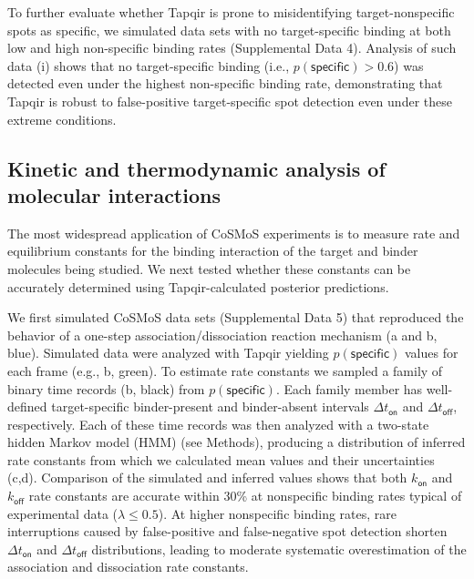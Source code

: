 To further evaluate whether Tapqir is prone to misidentifying target-nonspecific spots as specific, we  simulated data sets with no target-specific binding at both low and high non-specific binding rates (Supplemental Data 4). Analysis of such data (i) shows that no target-specific binding (i.e., $p(\mathsf{specific}) > 0.6$) was detected even under the highest non-specific binding rate, demonstrating that Tapqir is robust to false-positive target-specific spot detection even under these extreme conditions. 



\subsection{Kinetic and thermodynamic analysis of molecular interactions}

The most widespread application of CoSMoS experiments is to measure rate and equilibrium constants for the binding interaction of the target and binder molecules being studied.  We next tested whether these constants can be accurately determined using Tapqir-calculated posterior predictions. 

We first simulated CoSMoS data sets (Supplemental Data 5) that reproduced the behavior of a one-step association/dissociation reaction mechanism (a and b, blue). Simulated data were analyzed with Tapqir yielding $p(\mathsf{specific})$ values for each frame (e.g., b, green). To estimate rate constants we sampled a family of binary time records (b, black) from $p(\mathsf{specific})$. Each family member has well-defined target-specific binder-present and binder-absent intervals $\Delta t_\mathsf{on}$ and $\Delta t_\mathsf{off}$, respectively. Each of these time records was then analyzed with a two-state hidden Markov model (HMM) (see Methods), producing a distribution of inferred rate constants from which we calculated mean values and their uncertainties (c,d). Comparison of the simulated and inferred values shows that both $k_\mathsf{on}$ and $k_\mathsf{off}$ rate constants are accurate within 30\% at nonspecific binding rates typical of experimental data ($\lambda \leq 0.5$). At higher nonspecific binding rates, rare interruptions caused by false-positive and false-negative spot detection shorten $\Delta t_\mathsf{on}$ and $\Delta t_\mathsf{off}$ distributions, leading to moderate systematic overestimation of the association and dissociation rate constants.

